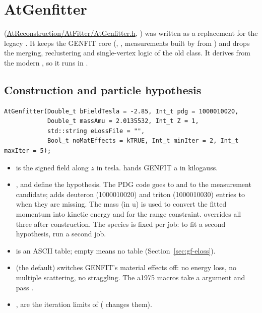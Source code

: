 \section{AtGenfitter}
\label{sec:gf}

 (\url{AtReconstruction/AtFitter/AtGenfitter.h}, ) was written as a replacement
for the legacy . It keeps the GENFIT core (,
, measurements built by  from ) and
drops the merging, reclustering and single-vertex logic of the old class. It derives from the modern
, so it runs in .

\subsection{Construction and particle hypothesis}

\begingroup\footnotesize
\begin{verbatim}
AtGenfitter(Double_t bFieldTesla = -2.85, Int_t pdg = 1000010020,
            Double_t massAmu = 2.0135532, Int_t Z = 1,
            std::string eLossFile = "",
            Bool_t noMatEffects = kTRUE, Int_t minIter = 2, Int_t maxIter = 5);
\end{verbatim}
\endgroup

\begin{itemize}
\item {} is the signed field along $z$ in tesla.  hands GENFIT a
   in kilogauss.
\item {},  and  define the hypothesis. The PDG code goes to  and to the
  measurement candidate;  adds deuteron (1000010020) and triton (1000010030) entries to
   when they are missing. The mass (in u) is used to convert the fitted momentum into kinetic
  energy and for the range constraint.  overrides all three after construction.
  The species is fixed per job: to fit a second hypothesis, run a second job.
\item {} is an ASCII \dedx{} table; empty means no table (Section~\ref{sec:gf-eloss}).
\item {} (the default) switches GENFIT's material effects off: no energy loss, no multiple
  scattering, no straggling. The a1975 macros take a  argument and pass .
\item {},  are the iteration limits of 
  ( changes them).
\end{itemize}

